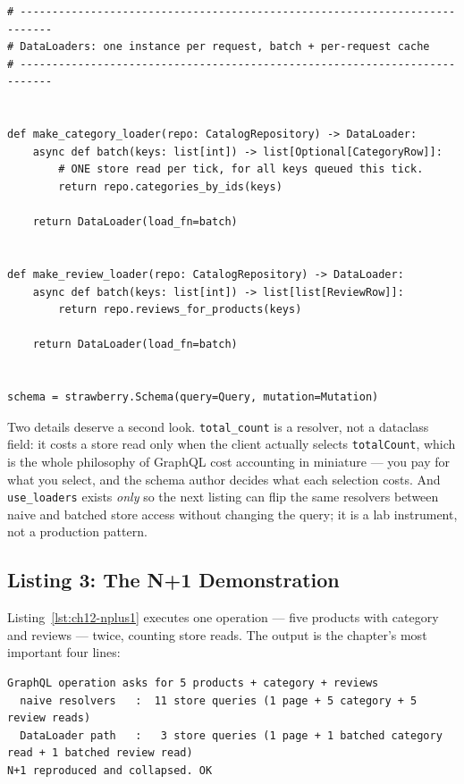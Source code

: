 \begin{verbatim}
# ---------------------------------------------------------------------------
# DataLoaders: one instance per request, batch + per-request cache
# ---------------------------------------------------------------------------


def make_category_loader(repo: CatalogRepository) -> DataLoader:
    async def batch(keys: list[int]) -> list[Optional[CategoryRow]]:
        # ONE store read per tick, for all keys queued this tick.
        return repo.categories_by_ids(keys)

    return DataLoader(load_fn=batch)


def make_review_loader(repo: CatalogRepository) -> DataLoader:
    async def batch(keys: list[int]) -> list[list[ReviewRow]]:
        return repo.reviews_for_products(keys)

    return DataLoader(load_fn=batch)


schema = strawberry.Schema(query=Query, mutation=Mutation)
\end{verbatim}

Two details deserve a second look. \texttt{total\_count} is a resolver, not
a dataclass field: it costs a store read only when the client actually
selects \texttt{totalCount}, which is the whole philosophy of GraphQL
cost accounting in miniature --- you pay for what you select, and the
schema author decides what each selection costs. And
\texttt{use\_loaders} exists \emph{only} so the next listing can flip the
same resolvers between naive and batched store access without changing
the query; it is a lab instrument, not a production pattern.

\subsection{Listing 3: The N+1 Demonstration}
\label{subsec:ch12-code-nplus1}

Listing~\ref{lst:ch12-nplus1} executes one operation --- five products
with category and reviews --- twice, counting store reads. The output is
the chapter's most important four lines:

\begin{verbatim}
GraphQL operation asks for 5 products + category + reviews
  naive resolvers   :  11 store queries (1 page + 5 category + 5 review reads)
  DataLoader path   :   3 store queries (1 page + 1 batched category read + 1 batched review read)
N+1 reproduced and collapsed. OK
\end{verbatim}

